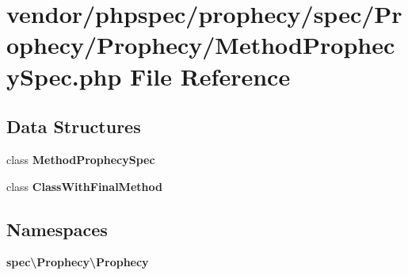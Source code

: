 \section{vendor/phpspec/prophecy/spec/\+Prophecy/\+Prophecy/\+Method\+Prophecy\+Spec.php File Reference}
\label{_method_prophecy_spec_8php}
\subsection*{Data Structures}
\begin{DoxyCompactItemize}
\item 
class {\bf Method\+Prophecy\+Spec}
\item 
class {\bf Class\+With\+Final\+Method}
\end{DoxyCompactItemize}
\subsection*{Namespaces}
\begin{DoxyCompactItemize}
\item 
 {\bf spec\textbackslash{}\+Prophecy\textbackslash{}\+Prophecy}
\end{DoxyCompactItemize}
